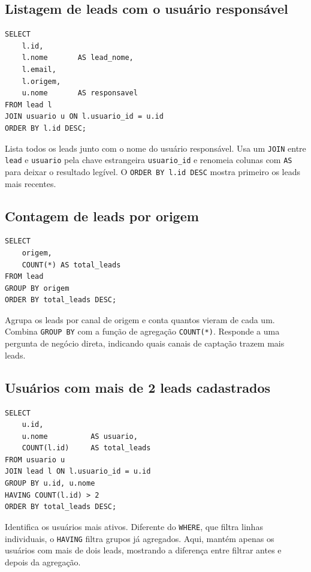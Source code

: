 \documentclass[a4paper]{article}
\begin{document}
\subsection{Listagem de leads com o usuário responsável}

\begin{verbatim}
SELECT
    l.id,
    l.nome       AS lead_nome,
    l.email,
    l.origem,
    u.nome       AS responsavel
FROM lead l
JOIN usuario u ON l.usuario_id = u.id
ORDER BY l.id DESC;
\end{verbatim}

Lista todos os leads junto com o nome do usuário responsável. Usa um \texttt{JOIN} entre
\texttt{lead} e \texttt{usuario} pela chave estrangeira \texttt{usuario\_id} e renomeia
colunas com \texttt{AS} para deixar o resultado legível. O \texttt{ORDER BY l.id DESC}
mostra primeiro os leads mais recentes.

\subsection{Contagem de leads por origem}

\begin{verbatim}
SELECT
    origem,
    COUNT(*) AS total_leads
FROM lead
GROUP BY origem
ORDER BY total_leads DESC;
\end{verbatim}

Agrupa os leads por canal de origem e conta quantos vieram de cada um. Combina
\texttt{GROUP BY} com a função de agregação \texttt{COUNT(*)}. Responde a uma pergunta de
negócio direta, indicando quais canais de captação trazem mais leads.

\subsection{Usuários com mais de 2 leads cadastrados}

\begin{verbatim}
SELECT
    u.id,
    u.nome          AS usuario,
    COUNT(l.id)     AS total_leads
FROM usuario u
JOIN lead l ON l.usuario_id = u.id
GROUP BY u.id, u.nome
HAVING COUNT(l.id) > 2
ORDER BY total_leads DESC;
\end{verbatim}

Identifica os usuários mais ativos. Diferente do \texttt{WHERE}, que filtra linhas
individuais, o \texttt{HAVING} filtra grupos já agregados. Aqui, mantém apenas os usuários
com mais de dois leads, mostrando a diferença entre filtrar antes e depois da agregação.
\end{document}
